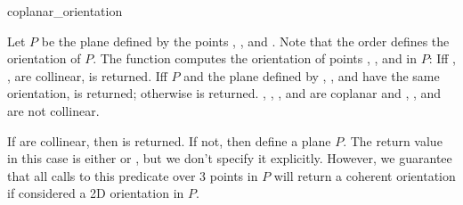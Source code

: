 \begin{ccRefFunction}{coplanar_orientation}

         {Let $P$ be the plane defined by the points , ,
          and . Note that the order defines the orientation of
          $P$. The function computes the orientation of points , 
          , and  in $P$: Iff , ,  are
          collinear,  is returned. Iff $P$ and the plane 
          defined by , , and  have the same orientation, 
           is returned; otherwise  is returned.  
          \ccPrecond {}, , , and  are coplanar and
          , , and  are not collinear.}

{If  are collinear, then  is returned.
If not, then  define a plane $P$.  The return value in this case is
either  or , but we don't specify it explicitly.
However, we guarantee that all calls to this predicate over 3 points in $P$
will return a coherent orientation if considered a 2D orientation in $P$.}

\ccSeeAlso

 \\
 \\
 \\

\end{ccRefFunction}

